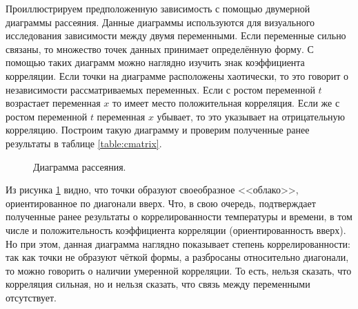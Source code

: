 Проиллюстрируем предположенную зависимость с помощью двумерной диаграммы рассеяния. Данные диаграммы используются для визуального исследования зависимости между двумя переменными. Если переменные сильно связаны, то множество точек данных принимает определённую форму. С помощью таких диаграмм можно наглядно изучить знак коэффициента корреляции. Если точки на диаграмме расположены хаотически, то это говорит о независимости рассматриваемых переменных. Если с ростом переменной $t$ возрастает переменная $x$ то имеет место положительная корреляция. Если же с ростом переменной $t$ переменная $x$ убывает, то это указывает на отрицательную корреляцию. Построим такую диаграмму и проверим полученные ранее результаты в таблице \ref{table:cmatrix}.
\begin{figure}[ht]
\caption{Диаграмма рассеяния.}
\label{img:scatterplot}
\end{figure}

Из рисунка \ref{img:scatterplot} видно, что точки образуют своеобразное <<облако>>, ориентированное по диагонали вверх. Что, в свою очередь, подтверждает полученные ранее результаты о коррелированности температуры и времени, в том числе и положительность коэффициента корреляции (ориентированность вверх). Но при этом, данная диаграмма наглядно показывает степень коррелированности: так как точки не образуют чёткой формы, а разбросаны относительно диагонали, то можно говорить о наличии умеренной корреляции. То есть, нельзя сказать, что корреляция сильная, но и нельзя сказать, что связь между переменными отсутствует.
